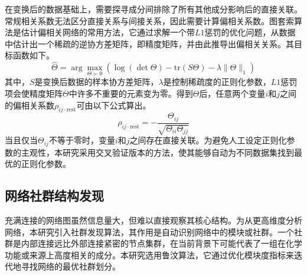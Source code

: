 在变换后的数据基础上，需要探寻成分间排除了所有其他成分影响后的直接关联。常规相关系数无法区分直接关系与间接关系，因此需要计算偏相关系数。图套索算法是估计偏相关网络的常用方法，它通过求解一个带$L1$惩罚的优化问题，从数据中估计出一个稀疏的逆协方差矩阵，即精度矩阵，并由此推导出偏相关关系。其目标函数如下。
\begin{equation}
\hat{\Theta} = \arg\max_{\Theta \succ 0} \left( \log(\det\Theta) - \text{tr}(S\Theta) - \lambda \|\Theta\|_1 \right)
\end{equation}
其中，$S$是变换后数据的样本协方差矩阵，$\lambda$是控制稀疏度的正则化参数，$L1$惩罚项会使精度矩阵$\Theta$中许多不重要的元素变为零。得到$\Theta$后，任意两个变量$i$和$j$之间的偏相关系数$\rho_{ij \cdot \text{rest}}$可由以下公式算出。
\begin{equation}
\rho_{ij \cdot \text{rest}} = - \frac{\Theta_{ij}}{\sqrt{\Theta_{ii} \Theta_{jj}}}
\end{equation}
当且仅当$\Theta_{ij}$不等于零时，变量$i$和$j$之间存在直接关联。为避免人工设定正则化参数的主观性，本研究采用交叉验证版本的方法，使其能够自动为不同数据集找到最优的正则化参数。

\subsection{网络社群结构发现}
充满连接的网络图虽然信息量大，但难以直接观察其核心结构。为从更高维度分析网络，本研究引入社群发现算法，其作用是自动识别网络中的模块或社群。一个社群是内部连接远比外部连接紧密的节点集群，在当前背景下可能代表了一组在化学功能或来源上高度相关的成分。本研究选用鲁汶算法，它通过优化模块度指标来迭代地寻找网络的最优社群划分。

